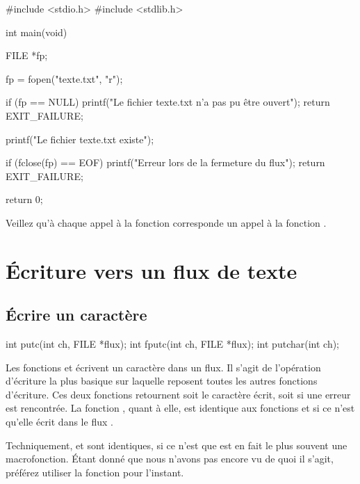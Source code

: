 \begin{C}
#include <stdio.h>
#include <stdlib.h>


int main(void)
{
    FILE *fp;

    fp = fopen("texte.txt", "r");

    if (fp == NULL)
    {
        printf("Le fichier texte.txt n'a pas pu être ouvert\n");
        return EXIT_FAILURE;
    }

    printf("Le fichier texte.txt existe\n");

    if (fclose(fp) == EOF)
    {
        printf("Erreur lors de la fermeture du flux\n");
        return EXIT_FAILURE;        
    }

    return 0;
}
\end{C}

\begin{attentionbox} 
 Veillez qu'à chaque appel à la fonction
 corresponde un appel à la fonction .
\end{attentionbox}

\section{Écriture vers un flux de texte }
\label{ecriture-vers-un-flux-de-texte }

\subsection{Écrire un caractère}
\label{ecrire-un-caractère}

\begin{C}
int putc(int ch, FILE *flux);
int fputc(int ch, FILE *flux);
int putchar(int ch);
\end{C}

Les fonctions  et  écrivent un caractère
dans un flux. Il s'agit de l'opération d'écriture la plus basique sur
laquelle reposent toutes les autres fonctions d'écriture. Ces deux
fonctions retournent soit le caractère écrit, soit  si une
erreur est rencontrée. La fonction , quant à elle, est
identique aux fonctions  et  si ce n'est
qu'elle écrit dans le flux .

\begin{infobox} 
 Techniquement,  et
 sont identiques, si ce n'est que  est en
fait le plus souvent une macrofonction. Étant donné que nous n'avons pas
encore vu de quoi il s'agit, préférez utiliser la fonction
 pour l'instant.
\end{infobox}


